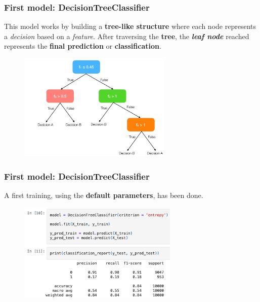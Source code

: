 \documentclass{beamer}
\begin{document}
\begin{frame}
\frametitle{First model: \textbf{DecisionTreeClassifier}}
This model works by building a \textbf{tree-like structure} where each node represents a \textit{decision} based on a \textit{feature}. After traversing the \textbf{tree}, the \textbf{\textit{leaf node}} reached represents the \textbf{final prediction} or \textbf{classification}.
\begin{figure}
\centering
    \includegraphics[width=0.65\textwidth]{imgs/dtc.png}
    \label{fig:dtc}
\end{figure}
\end{frame}

\begin{frame}
\frametitle{First model: \textbf{DecisionTreeClassifier}}
A first training, using the \textbf{default parameters}, has been done.
\begin{figure}
\centering
    \includegraphics[width=0.68\textwidth]{imgs/dtc_code.png}
    \label{fig:dtc_code}
\end{figure}
\end{frame}
\end{document}
